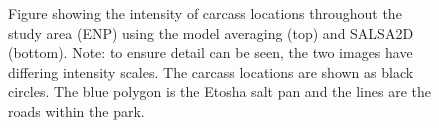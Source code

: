 \documentclass[letterpaper]{interact}
\begin{document}

\begin{figure}[!hb]
     \centering
     \begin{subfloat}{%
    }
    \hspace{1pt}
     \end{subfloat}
    \begin{subfloat}[SALSA 2D]{%
    }
    \hspace{5pt}
    \end{subfloat}
     \caption{Figure showing the intensity of carcass locations throughout the study area (ENP) using the model averaging (top) and SALSA2D (bottom). Note: to ensure detail can be seen, the two images have differing intensity scales. The carcass locations are shown as black circles. The blue polygon is the Etosha salt pan and the lines are the roads within the park.}
        \label{fig:simmaps}
\end{figure}
\end{document}
